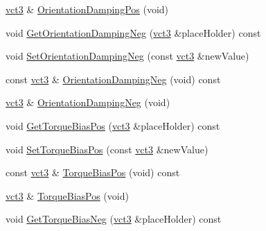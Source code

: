 \begin{DoxyCompactItemize}
\item 
\hyperlink{vct_fixed_size_vector_types_8h_a3af82acdbf4eeb73c551909240b106ea}{vct3} \& \hyperlink{classprm_fixture_gain_cartesian_set_a0548f62e945bf28d64969320071e8fc4}{Orientation\+Damping\+Pos} (void)
\item 
void \hyperlink{classprm_fixture_gain_cartesian_set_a66fd3c84d0e6e0f506132cb11b4956fc}{Get\+Orientation\+Damping\+Neg} (\hyperlink{vct_fixed_size_vector_types_8h_a3af82acdbf4eeb73c551909240b106ea}{vct3} \&place\+Holder) const 
\item 
void \hyperlink{classprm_fixture_gain_cartesian_set_a60cd207226e60d8e96279ccc41717a0d}{Set\+Orientation\+Damping\+Neg} (const \hyperlink{vct_fixed_size_vector_types_8h_a3af82acdbf4eeb73c551909240b106ea}{vct3} \&new\+Value)
\item 
const \hyperlink{vct_fixed_size_vector_types_8h_a3af82acdbf4eeb73c551909240b106ea}{vct3} \& \hyperlink{classprm_fixture_gain_cartesian_set_a8044209170f9f4b4319de0eeeb5744f8}{Orientation\+Damping\+Neg} (void) const 
\item 
\hyperlink{vct_fixed_size_vector_types_8h_a3af82acdbf4eeb73c551909240b106ea}{vct3} \& \hyperlink{classprm_fixture_gain_cartesian_set_ade1010069dbeecab51e7a67a5aa3643e}{Orientation\+Damping\+Neg} (void)
\item 
void \hyperlink{classprm_fixture_gain_cartesian_set_ac9b48e4fc6c6e7d2120cd8503b5046c3}{Get\+Torque\+Bias\+Pos} (\hyperlink{vct_fixed_size_vector_types_8h_a3af82acdbf4eeb73c551909240b106ea}{vct3} \&place\+Holder) const 
\item 
void \hyperlink{classprm_fixture_gain_cartesian_set_a69ddbc2a1ab28c10f6efba56401fb677}{Set\+Torque\+Bias\+Pos} (const \hyperlink{vct_fixed_size_vector_types_8h_a3af82acdbf4eeb73c551909240b106ea}{vct3} \&new\+Value)
\item 
const \hyperlink{vct_fixed_size_vector_types_8h_a3af82acdbf4eeb73c551909240b106ea}{vct3} \& \hyperlink{classprm_fixture_gain_cartesian_set_ad9941ff289b7b136c5ee621ecd0d7b52}{Torque\+Bias\+Pos} (void) const 
\item 
\hyperlink{vct_fixed_size_vector_types_8h_a3af82acdbf4eeb73c551909240b106ea}{vct3} \& \hyperlink{classprm_fixture_gain_cartesian_set_aac09bddd515e8ff1eec93e86bed83a7d}{Torque\+Bias\+Pos} (void)
\item 
void \hyperlink{classprm_fixture_gain_cartesian_set_aacf822df14bef782f995ab98ca73569a}{Get\+Torque\+Bias\+Neg} (\hyperlink{vct_fixed_size_vector_types_8h_a3af82acdbf4eeb73c551909240b106ea}{vct3} \&place\+Holder) const 
\item 

\end{DoxyCompactItemize}
